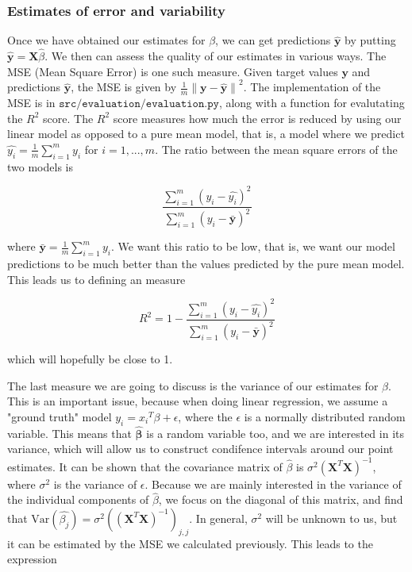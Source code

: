 \documentclass{article}
\begin{document}
\subsubsection{Estimates of error and variability}

Once we have obtained our estimates for $\beta$, we can get predictions $\mathbf{\hat{y}}$ by putting $\mathbf{\hat{y}} = \mathbf{X}\hat{\beta}$. We then can assess the quality of our estimates in various ways. The MSE (Mean Square Error) is one such measure. Given target values $\mathbf{y}$ and predictions $\mathbf{\hat{y}}$, the MSE is given by $\frac{1}{m}\left\|\mathbf{y - \hat{y}}\right\|^2$. The implementation of the MSE is in $\texttt{src/evaluation/evaluation.py}$, along with a function for evalutating the $R^2$ score. The $R^2$ score measures how much the error is reduced by using our linear model as opposed to a pure mean model, that is, a model where we predict $\hat{y_i} = \frac{1}{m}\sum_{i=1}^{m}{y_i}$ for $i=1, ..., m$. The ratio between the mean square errors of the two models is

$$
\frac{ \sum_{i=1}^{m}{(y_i - \hat{y_i})^2}}{ \sum_{i=1}^{m}{(y_i - \bar{\mathbf{y}})^2}}
$$

where $\bar{\mathbf{y}} = \frac{1}{m}\sum_{i=1}^{m}{y_i}$. We want this ratio to be low, that is, we want our model predictions to be much better than the values predicted by the pure mean model. This leads us to defining an measure

$$
R^2
= 1 -
\frac{ \sum_{i=1}^{m}{(y_i - \hat{y_i})^2}}{ \sum_{i=1}^{m}{(y_i - \bar{\mathbf{y}})^2}}
$$

which will hopefully be close to 1.

The last measure we are going to discuss is the variance of our estimates for $\beta$. This is an important issue, because when doing linear regression, we assume a "ground truth" model $y_i = {x_i}^T\beta + \epsilon$, where the $\epsilon$ is a normally distributed random variable. This means that $\mathbf{\hat{\beta}}$ is a random variable too, and we are interested in its variance, which will allow us to construct condifence intervals around our point estimates. It can be shown that the covariance matrix of $\hat{\beta}$ is ${\sigma}^2 ({\mathbf{X}}^T \mathbf{X})^{-1}$, where ${\sigma}^2$ is the variance of ${\epsilon}$. Because we are mainly interested in the variance of the individual components of $\hat{\beta}$, we focus on the diagonal of this matrix, and find that $\mathrm{Var}(\hat{\beta_j}) = {\sigma}^2 (({\mathbf{X}}^T \mathbf{X})^{-1})_{j, j}$. In general, ${\sigma}^2$ will be unknown to us, but it can be estimated by the MSE we calculated previously. This leads to the expression
\end{document}
